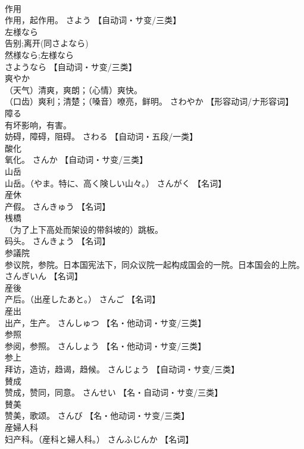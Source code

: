\documentclass[8pt]{extreport}
\begin{document}
\begin{CJK}{UTF8}{min}
\\	作用	
\\	作用，起作用。	さよう		【自动词・サ变/三类】
\\	左様なら	
\\	告别;离开(同さよなら) 
\\	然様なら;左様なら 
\\	さようなら		【自动词・サ变/三类】
\\	爽やか	
\\	（天气）清爽，爽朗；（心情）爽快。 
\\	（口齿）爽利；清楚；（嗓音）嘹亮，鲜明。	さわやか		【形容动词/ナ形容词】
\\	障る	
\\	有坏影响，有害。 
\\	妨碍，障碍，阻碍。	さわる		【自动词・五段/一类】
\\	酸化	
\\	氧化。	さんか		【自动词・サ变/三类】
\\	山岳	
\\	山岳。（やま。特に、高く険しい山々。）	さんがく		【名词】
\\	産休	
\\	产假。	さんきゅう		【名词】
\\	桟橋	
\\	（为了上下高处而架设的带斜坡的）跳板。 
\\	码头。	さんきょう		【名词】
\\	参議院	
\\	参议院，参院。日本国宪法下，同众议院一起构成国会的一院。日本国会的上院。	さんぎいん		【名词】
\\	産後	
\\	产后。（出産したあと。）	さんご		【名词】
\\	産出	
\\	出产，生产。	さんしゅつ		【名・他动词・サ变/三类】
\\	参照	
\\	参阅，参照。	さんしょう		【名・他动词・サ变/三类】
\\	参上	
\\	拜访，造访，趋谒，趋候。	さんじょう		【自动词・サ变/三类】
\\	賛成	
\\	赞成，赞同，同意。	さんせい		【名・自动词・サ变/三类】
\\	賛美	
\\	赞美，歌颂。	さんび		【名・他动词・サ变/三类】
\\	産婦人科	
\\	妇产科。（産科と婦人科。）	さんふじんか		【名词】

\end{CJK}
\end{document}
